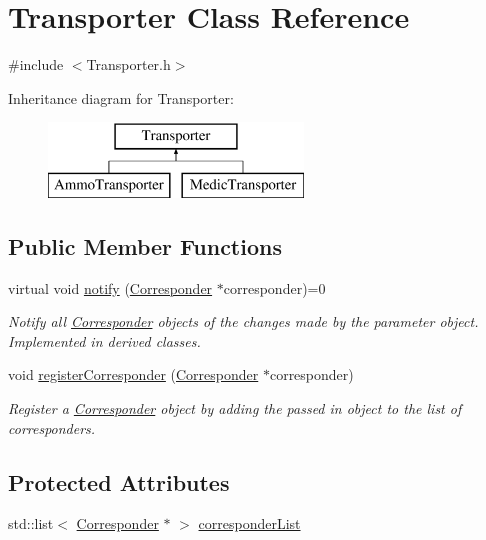 \hypertarget{class_transporter}{}\section{Transporter Class Reference}
\label{class_transporter}


{\ttfamily \#include $<$Transporter.\+h$>$}

Inheritance diagram for Transporter\+:\begin{figure}[H]
\begin{center}
\leavevmode
\includegraphics[height=2.000000cm]{class_transporter}
\end{center}
\end{figure}
\subsection*{Public Member Functions}
\begin{DoxyCompactItemize}
\item 
virtual void \mbox{\hyperlink{class_transporter_aadf5e8b8dabe203e8b184ae00847c249}{notify}} (\mbox{\hyperlink{class_corresponder}{Corresponder}} $\ast$corresponder)=0
\begin{DoxyCompactList}\small\item\em Notify all \mbox{\hyperlink{class_corresponder}{Corresponder}} objects of the changes made by the parameter object. Implemented in derived classes. \end{DoxyCompactList}\item 
void \mbox{\hyperlink{class_transporter_ab9c0e1033746e012d0d784d2a293b079}{register\+Corresponder}} (\mbox{\hyperlink{class_corresponder}{Corresponder}} $\ast$corresponder)
\begin{DoxyCompactList}\small\item\em Register a \mbox{\hyperlink{class_corresponder}{Corresponder}} object by adding the passed in object to the list of corresponders. \end{DoxyCompactList}\end{DoxyCompactItemize}
\subsection*{Protected Attributes}
\begin{DoxyCompactItemize}
\item 
std\+::list$<$ \mbox{\hyperlink{class_corresponder}{Corresponder}} $\ast$ $>$ \mbox{\hyperlink{class_transporter_afd7004c5986280b5c65aac41c66a1ec7}{corresponder\+List}}
\end{DoxyCompactItemize}


